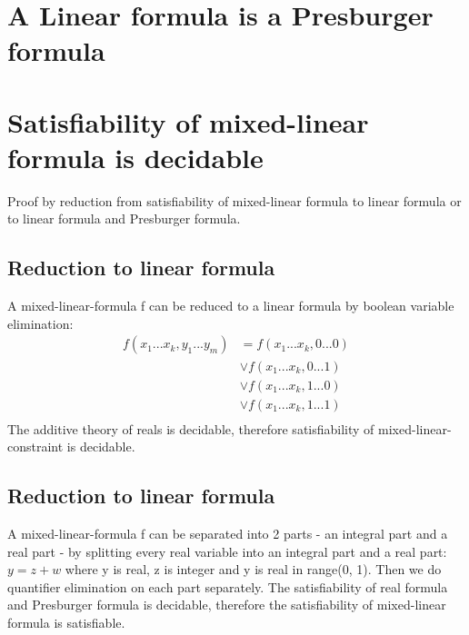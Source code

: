 \documentclass{article}
\begin{document}
\section{A Linear formula is a Presburger formula}

\section{Satisfiability of mixed-linear formula is decidable}

Proof by reduction from satisfiability of mixed-linear formula to linear 
formula or to linear formula and Presburger formula.

\subsection{Reduction to linear formula}
A mixed-linear-formula f can be reduced to a linear formula by boolean variable 
elimination:
\begin{align*}
	f(x_1 ... x_k, y_1 ... y_m)
	&= f(x_1 ... x_k, 0 ... 0)\\
	&\lor f(x_1 ... x_k, 0 ... 1)\\
	&\lor f(x_1 ... x_k, 1 ... 0)\\
	&\lor f(x_1 ... x_k, 1 ... 1)\\
\end{align*}
The additive theory of reals is decidable, therefore satisfiability of 
mixed-linear-constraint is decidable.

\subsection{Reduction to linear formula}
A mixed-linear-formula f can be separated into 2 parts - an integral part and a 
real part - by splitting every real variable into an integral part and a real 
part: $ y = z + w $ where y is real, z is integer and y is real in range(0, 1). 
Then we do quantifier elimination on each part separately. The satisfiability 
of real formula and Presburger formula is decidable, therefore the 
satisfiability of mixed-linear formula is satisfiable.
\end{document}
